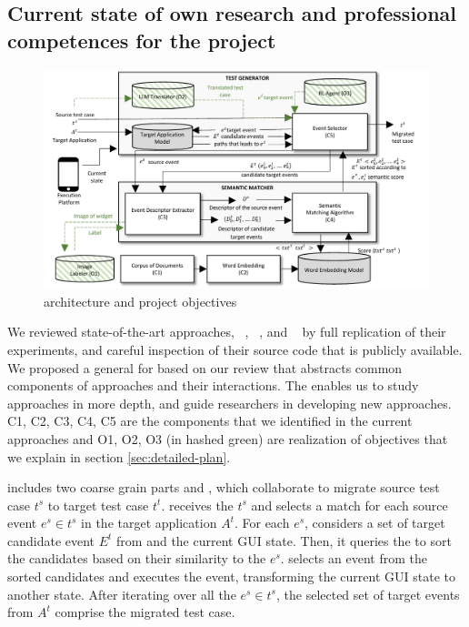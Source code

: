 	
\subsection{Current state of own research and professional competences for the project}
\label{sec:own-research}

\begin{figure}[h]
	\centering
	\includegraphics[width=\textwidth]{images/architecture.pdf}
	\caption{\testreuse architecture and project objectives}
	\label{fig:architecture}
\end{figure}

We reviewed state-of-the-art \testreuse approaches, \craftdroid~\cite{lin:craftdroid:ASE:2019}, \atm~\cite{behrang:apptestmigrator:ASE:2019}, and \adaptdroid~\cite{Mariani:Adaptdroid:AST:2021} by full replication of their experiments, and careful inspection of their source code that is publicly available.
We proposed a general \architecture for \testreuse based on our review that abstracts common components of \testreuse approaches and their interactions. 
The \architecture enables us to study \testreuse approaches in more depth, and guide researchers in developing new approaches.
C1, C2, C3, C4, C5 are the components that we identified in the current approaches and O1, O2, O3 (in hashed green) are realization of \project objectives that we explain in section \ref{sec:detailed-plan}. 


\bigskip
\testreuse  includes two coarse grain parts \generator and \matcher, which collaborate to migrate source test case $t^s$ to target test case $t^t$.
\generator receives the $t^s$ and selects a match for each source event $e^s \in t^s$ in the target application $A^t$.
For each $e^s$, \generator considers a set of target candidate event $E^t$ from \tam and the current GUI state. 
Then, it queries the \matcher to sort the candidates based on their similarity to the $e^s$.
\generator selects an event from the sorted candidates and executes the event, transforming the current GUI state to another state. 
After iterating over all the $e^s \in t^s$, the selected set of target events from $A^t$ comprise the migrated test case.



